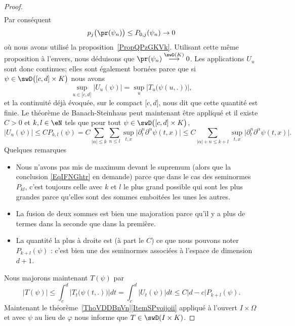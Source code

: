 \begin{proof}
\begin{subequations}
\begin{align}
        \end{align}
    \end{subequations}
    Par conséquent
    \begin{equation}
        p_j\big( \pr(\psi_n) \big)\leq P_{0,j}(\psi_n)\to 0
    \end{equation}
    où nous avons utilisé la proposition~\ref{PropQPzGKVk}. Utilisant cette même proposition à l'envers, nous déduisons que \( \pr(\psi_n)\stackrel{\swD(K)}{\longrightarrow}0\). Les applications \( U_u\) sont donc continues; elles sont également bornées parce que si \( \psi\in\swD\big( \mathopen[ c , d \mathclose]\times K \big) \) nous avons
    \begin{equation}
        \sup_{u \in\mathopen[ c , d \mathclose]}\big| U_u(\psi) \big|=\sup_u \big| T_u\big( \psi(u,.) \big) \big|,
    \end{equation}
    et la continuité déjà évoquée, sur le compact \( \mathopen[ c , d \mathclose]\), nous dit que cette quantité est finie. Le théorème de Banach-Steinhaus peut maintenant être appliqué et il existe \( C>0\) et \( k,l\in \eN\) tels que pour tout \( \psi\in\swD\big( \mathopen[ c , d \mathclose]\times K \big)\),
    \begin{equation}
        \big| U_u(\psi) \big|\leq C P_{k,l}(\psi)=C\sum_{| \alpha |\leq k}\sum_{n\leq l}\sup_{t,x}\big| \partial_t^n\partial^{\alpha}\psi(t,x) \big|\leq C\sum_{| \alpha |+n\leq k+l}\sup_{t,x}\big| \partial_t^n\partial^{\alpha}\psi(t,x) \big|.
    \end{equation}
    Quelques remarques
    \begin{itemize}
        \item Nous n'avons pas mis de maximum devant le supremum (alors que la conclusion \eqref{EqIFNGhtr} en demande) parce que dans le cas des seminormes \( P_{kl}\), c'est toujours celle avec \( k\) et \( l\) le plus grand possible qui sont les plus grandes parce qu'elles sont des sommes emboitées les unes les autres.
        \item La fusion de deux sommes est bien une majoration parce qu'il y a plus de termes dans la seconde que dans la première.
        \item La quantité la plus à droite est (à part le \( C\)) ce que nous pouvons noter \( P_{k+l}(\psi)\) : c'est bien une des seminormes associées à l'espace de dimension \( d+1\).
    \end{itemize}
    Nous majorons maintenant \( T(\psi)\) par
    \begin{equation}
            \big| T(\psi) \big|\leq \int_c^d\big| T_t\big( \psi(t,.) \big) \big|dt
            =\int_c^d\big|   U_t(\psi) \big|dt
            \leq C| d-c |P_{k+l}(\psi).
    \end{equation}
    Maintenant le théorème~\ref{ThoVDDBnVn}\ref{ItemSPvoijoii} appliqué à l'ouvert \( I\times \Omega\) et avec \( \psi\) au lieu de \( \varphi\) nous informe que \( T\in\swD(I\times K)\).
\end{proof}

